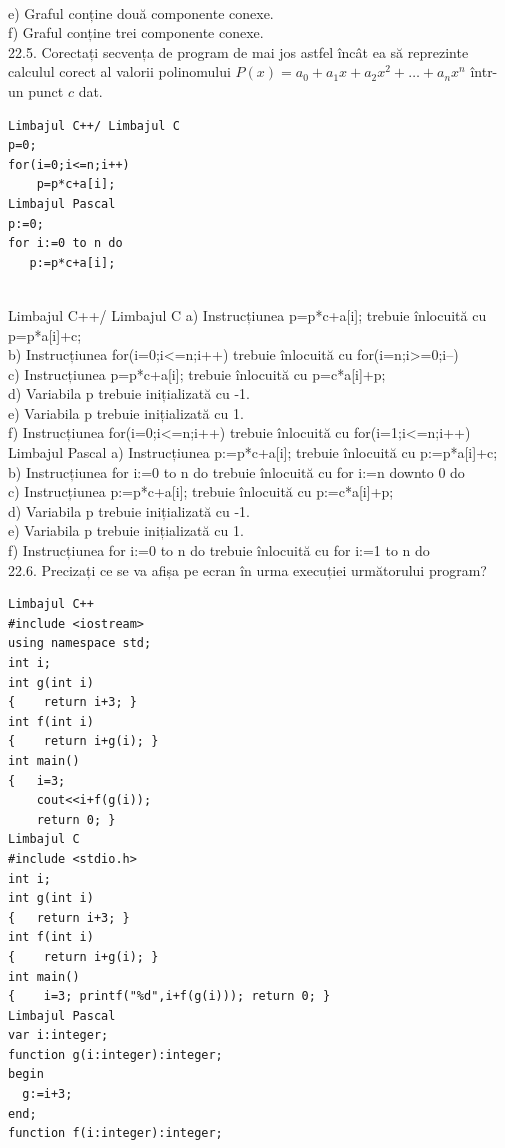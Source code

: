 {{\\
e) Graful 
conține două 
componente 
conexe.
\\
f) Graful 
conține trei 
componente 
conexe.
\\
22.5. Corectați secvența de program de mai jos astfel încât ea să reprezinte calculul corect al valorii polinomului $P(x)=a_{0}+a_{1} x+a_{2} x^{2}+\ldots+a_{n} x^{n}$ într-un punct $c$ dat.
\begin{verbatim}
Limbajul C++/ Limbajul C
p=0;
for(i=0;i<=n;i++)
    p=p*c+a[i];
Limbajul Pascal 
p:=0; 
for i:=0 to n do 
   p:=p*c+a[i];
\end{verbatim}
\\
Limbajul C++/ Limbajul C
a) Instrucțiunea p=p*c+a[i]; trebuie
înlocuită cu p=p*a[i]+c; 
\\
b) Instrucțiunea  for(i=0;i<=n;i++) 
trebuie înlocuită cu  
for(i=n;i>=0;i--) 
\\
c) Instrucțiunea p=p*c+a[i];  
trebuie înlocuită cu p=c*a[i]+p;
\\ 
d) Variabila p trebuie inițializată cu -1.
\\ 
e) Variabila p trebuie inițializată cu 1. 
\\
f) Instrucțiunea  for(i=0;i<=n;i++) 
trebuie înlocuită cu 
for(i=1;i<=n;i++)
\\
Limbajul Pascal
a) Instrucțiunea p:=p*c+a[i]; trebuie 
înlocuită cu p:=p*a[i]+c;
\\ 
b) Instrucțiunea for i:=0 to n do 
trebuie înlocuită cu  
for i:=n downto 0 do 
\\
c) Instrucțiunea p:=p*c+a[i];  
trebuie înlocuită cu  
p:=c*a[i]+p; 
\\
d) Variabila p trebuie inițializată cu -1.
\\ 
e) Variabila p trebuie inițializată cu 1. 
\\
f) Instrucțiunea for i:=0 to n do  
trebuie înlocuită cu 
for i:=1 to n do
\\
22.6. Precizați ce se va afișa pe ecran în urma execuției următorului program?
\begin{verbatim}
Limbajul C++ 
#include <iostream> 
using namespace std; 
int i; 
int g(int i) 
{    return i+3; } 
int f(int i) 
{    return i+g(i); } 
int main() 
{   i=3; 
    cout<<i+f(g(i)); 
    return 0; }
Limbajul C 
#include <stdio.h> 
int i; 
int g(int i) 
{   return i+3; } 
int f(int i) 
{    return i+g(i); } 
int main() 
{    i=3; printf("%d",i+f(g(i))); return 0; }
Limbajul Pascal 
var i:integer; 
function g(i:integer):integer; 
begin 
  g:=i+3;  
end; 
function f(i:integer):integer; 

\end{verbatim}}}
